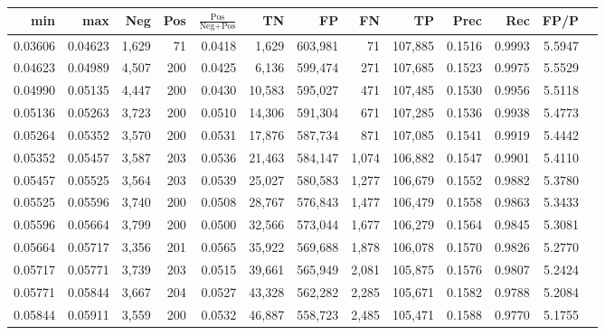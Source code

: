 \begin{tabular}{rrrrrrrrrrrrr}
\toprule
    min &     max &   Neg & Pos & $\frac{\text{Pos}}{\text{Neg}+\text{Pos}}$ &      TN &      FP &      FN &      TP &   Prec &    Rec &   FP/P \\
\midrule
0.03606 & 0.04623 & 1,629 &  71 &                                     0.0418 &   1,629 & 603,981 &      71 & 107,885 & 0.1516 & 0.9993 & 5.5947 \\
0.04623 & 0.04989 & 4,507 & 200 &                                     0.0425 &   6,136 & 599,474 &     271 & 107,685 & 0.1523 & 0.9975 & 5.5529 \\
0.04990 & 0.05135 & 4,447 & 200 &                                     0.0430 &  10,583 & 595,027 &     471 & 107,485 & 0.1530 & 0.9956 & 5.5118 \\
0.05136 & 0.05263 & 3,723 & 200 &                                     0.0510 &  14,306 & 591,304 &     671 & 107,285 & 0.1536 & 0.9938 & 5.4773 \\
0.05264 & 0.05352 & 3,570 & 200 &                                     0.0531 &  17,876 & 587,734 &     871 & 107,085 & 0.1541 & 0.9919 & 5.4442 \\
0.05352 & 0.05457 & 3,587 & 203 &                                     0.0536 &  21,463 & 584,147 &   1,074 & 106,882 & 0.1547 & 0.9901 & 5.4110 \\
0.05457 & 0.05525 & 3,564 & 203 &                                     0.0539 &  25,027 & 580,583 &   1,277 & 106,679 & 0.1552 & 0.9882 & 5.3780 \\
0.05525 & 0.05596 & 3,740 & 200 &                                     0.0508 &  28,767 & 576,843 &   1,477 & 106,479 & 0.1558 & 0.9863 & 5.3433 \\
0.05596 & 0.05664 & 3,799 & 200 &                                     0.0500 &  32,566 & 573,044 &   1,677 & 106,279 & 0.1564 & 0.9845 & 5.3081 \\
0.05664 & 0.05717 & 3,356 & 201 &                                     0.0565 &  35,922 & 569,688 &   1,878 & 106,078 & 0.1570 & 0.9826 & 5.2770 \\
0.05717 & 0.05771 & 3,739 & 203 &                                     0.0515 &  39,661 & 565,949 &   2,081 & 105,875 & 0.1576 & 0.9807 & 5.2424 \\
0.05771 & 0.05844 & 3,667 & 204 &                                     0.0527 &  43,328 & 562,282 &   2,285 & 105,671 & 0.1582 & 0.9788 & 5.2084 \\
0.05844 & 0.05911 & 3,559 & 200 &                                     0.0532 &  46,887 & 558,723 &   2,485 & 105,471 & 0.1588 & 0.9770 & 5.1755 \\

\end{tabular}
